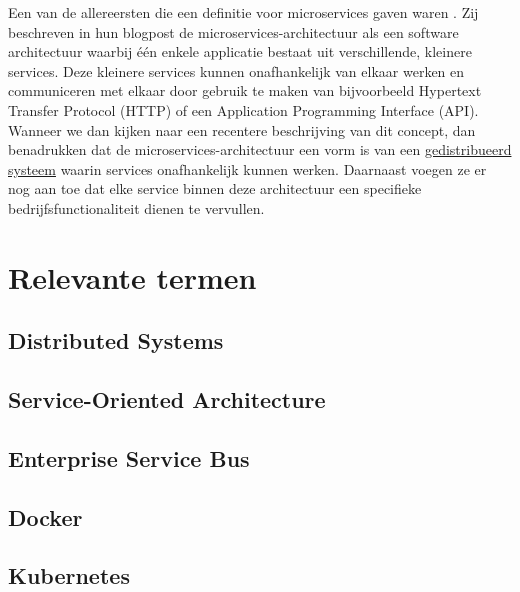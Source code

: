 Een van de allereersten die een definitie voor microservices gaven waren \textcite{Lewis2014}. Zij beschreven in hun blogpost de microservices-architectuur als een software architectuur waarbij één enkele applicatie bestaat uit verschillende, kleinere services. Deze kleinere services kunnen onafhankelijk van elkaar werken en communiceren met elkaar door gebruik te maken van bijvoorbeeld Hypertext Transfer Protocol (HTTP) of een Application Programming Interface (API). Wanneer we dan kijken naar een recentere beschrijving van dit concept, dan benadrukken \textcite{Velepucha2023} dat de microservices-architectuur een vorm is van een \hyperref[sec:distributed systems]{gedistribueerd systeem} waarin services onafhankelijk kunnen werken. Daarnaast voegen ze er nog aan toe dat elke service binnen deze architectuur een specifieke bedrijfsfunctionaliteit dienen te vervullen.

\section{Relevante termen}

\subsection{Distributed Systems}
\label{sec:distributed systems}

\subsection{Service-Oriented Architecture}

\subsection{Enterprise Service Bus}

\subsection{Docker}

\subsection{Kubernetes}



